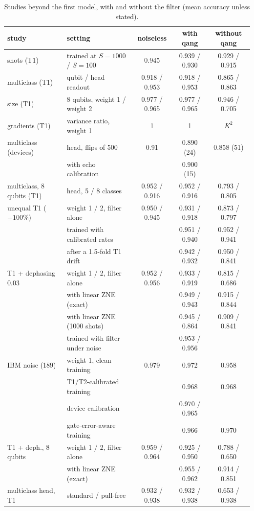 \documentclass[11pt]{article}
\begin{document}
\begin{table}[h]
\centering\small
\setlength{\tabcolsep}{3pt}
\begin{tabular}{llccc}
\toprule
study & setting & noiseless & with qang & without qang\\
\midrule
shots (T1) & trained at $S=1000$ / $S=100$ & 0.945 & 0.939 / 0.930 & 0.929 / 0.915\\
multiclass (T1) & qubit / head readout & 0.918 / 0.953 & 0.918 / 0.953 & 0.865 / 0.863\\
size (T1) & 8 qubits, weight 1 / weight 2 & 0.977 / 0.965 & 0.977 / 0.965 & 0.946 / 0.705\\
gradients (T1) & variance ratio, weight 1 & 1 & 1 & $K^2$\\
multiclass (devices) & head, flips of 500 & 0.91 & 0.890 (24) & 0.858 (51)\\
 & \quad with echo calibration & & 0.900 (15) & \\
multiclass, 8 qubits (T1) & head, 5 / 8 classes & 0.952 / 0.916 & 0.952 / 0.916 & 0.793 / 0.805\\
unequal T1 ($\pm100\%$) & weight 1 / 2, filter alone & 0.950 / 0.945 & 0.931 / 0.918 & 0.873 / 0.797\\
 & \quad trained with calibrated rates & & 0.951 / 0.940 & 0.952 / 0.941\\
 & \quad after a 1.5-fold T1 drift & & 0.942 / 0.932 & 0.950 / 0.841\\
T1 + dephasing 0.03 & weight 1 / 2, filter alone & 0.952 / 0.956 & 0.933 / 0.919 & 0.815 / 0.686\\
 & \quad with linear ZNE (exact) & & 0.949 / 0.943 & 0.915 / 0.844\\
 & \quad with linear ZNE (1000 shots) & & 0.945 / 0.864 & 0.909 / 0.841\\
 & \quad trained with filter under noise & & 0.953 / 0.956 & \\
IBM noise (189) & weight 1, clean training & 0.979 & 0.972 & 0.958\\
 & \quad T1/T2-calibrated training & & 0.968 & 0.968\\
 & \quad device calibration & & 0.970 / 0.965 & \\
 & \quad gate-error-aware training & & 0.966 & 0.970\\
T1 + deph., 8 qubits & weight 1 / 2, filter alone & 0.959 / 0.964 & 0.925 / 0.950 & 0.788 / 0.650\\
 & \quad with linear ZNE (exact) & & 0.955 / 0.962 & 0.914 / 0.851\\
multiclass head, T1 & standard / pull-free & 0.932 / 0.938 & 0.932 / 0.938 & 0.653 / 0.938\\
\bottomrule
\end{tabular}
\caption{Studies beyond the first model, with and without the filter (mean accuracy unless stated).}
\label{tab:beyond}
\end{table}
\end{document}
